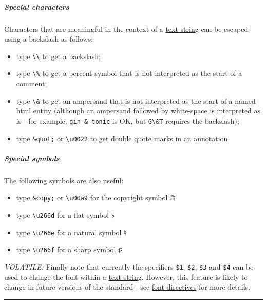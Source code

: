 \documentclass[oneside]{book}
\let\oldsubparagraph\subparagraph
\renewcommand{\subparagraph}[1]{\oldsubparagraph{#1}\mbox{}}
\begin{document}
\subparagraph{Special characters}\label{special_characters}

Characters that are meaningful in the context of a
\protect\hyperlink{text_string_definition}{text string} can be escaped
using a backslash as follows:

\begin{itemize}
\item
  type \texttt{\textbackslash{}\textbackslash{}} to get a backslash;
\item
  type \texttt{\textbackslash{}\%} to get a percent symbol that is not
  interpreted as the start of a
  \protect\hyperlink{comments_and_remarks}{comment};
\item
  type \texttt{\textbackslash{}\&} to get an ampersand that is not
  interpreted as the start of a named html entity (although an ampersand
  followed by white-space is interpreted as is - for example,
  \texttt{gin\ \&\ tonic} is OK, but \texttt{G\textbackslash{}\&T}
  requires the backslash);
\item
  type \texttt{\&quot;} or \texttt{\textbackslash{}u0022} to get double
  quote marks in an \protect\hyperlink{annotations}{annotation}
\end{itemize}

\hypertarget{special_symbols}{\subparagraph{Special
symbols}\label{special_symbols}}

The following symbols are also useful:

\begin{itemize}
\item
  type \texttt{\&copy;} or \texttt{\textbackslash{}u00a9} for the
  copyright symbol ©
\item
  type \texttt{\textbackslash{}u266d} for a flat symbol ♭
\item
  type \texttt{\textbackslash{}u266e} for a natural symbol ♮
\item
  type \texttt{\textbackslash{}u266f} for a sharp symbol ♯
\end{itemize}

\emph{VOLATILE:} Finally note that currently the specifiers
\texttt{\$1}, \texttt{\$2}, \texttt{\$3} and \texttt{\$4} can be used to
change the font within a \protect\hyperlink{text_string_definition}{text
string}. However, this feature is likely to change in future versions of
the standard - see \protect\hyperlink{font_directives}{font directives}
for more details.

\begin{center}\rule{0.5\linewidth}{\linethickness}\end{center}
\end{document}

